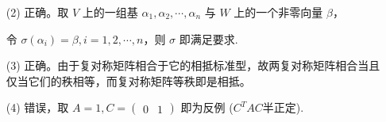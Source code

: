 \begin{enumerate}
\begin{enumerate}
        \item[(2)] 正确。取 \(V\) 上的一组基 \(\alpha_1,\alpha_2,\cdots,\alpha_n\) 与 \(W\) 上的一个非零向量 \(\beta\)，\par
        令 \(\sigma(\alpha_i)=\beta,i=1,2,\cdots,n\)，则 \(\sigma\) 即满足要求.
        \item[(3)] 正确。由于复对称矩阵相合于它的相抵标准型，故两复对称矩阵相合当且仅当它们的秩相等，而复对称矩阵等秩即是相抵。
        \item[(4)] 错误，取 \(A=1,C=\begin{pmatrix} 0 & 1 \end{pmatrix}\) 即为反例 (\(C^{T}AC\)半正定).
    \end{enumerate}
\end{enumerate}

\clearpage
